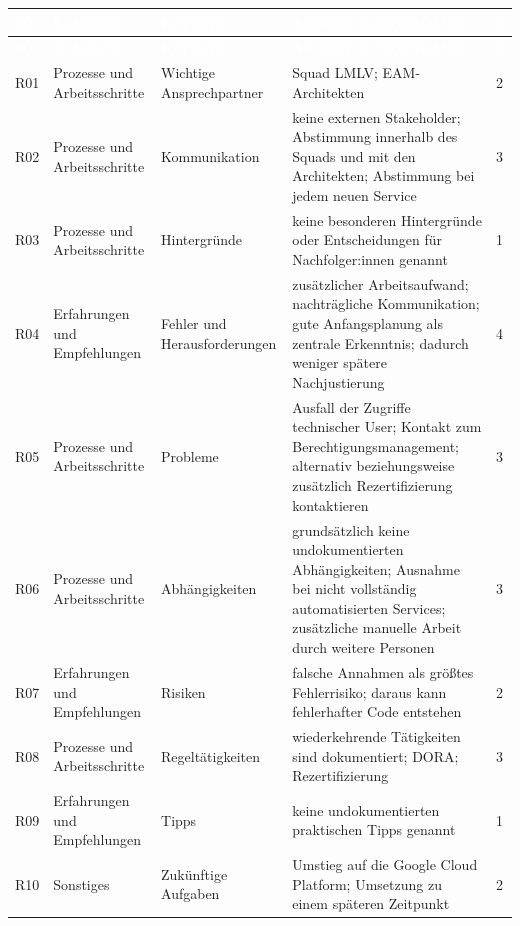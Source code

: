 \documentclass[
  10pt,
  ngerman,
  a4paper,
  toc=graduated,
  numbers=noenddot,
  headings=standardclasses
]{scrartcl}
\begin{document}
\scriptsize
\begin{longtable}{L{0.8cm}L{2.6cm}L{2.8cm}L{8.1cm}C{1.0cm}}
\toprule
{}
\textcolor{white}{\textbf{ID}} &
\textcolor{white}{\textbf{Kategorie}} &
\textcolor{white}{\textbf{Keyword}} &
\textcolor{white}{\textbf{Atomare Referenzfakten}} &
\textcolor{white}{\textbf{n}}\\
\midrule
\endfirsthead
\toprule
{}
\textcolor{white}{\textbf{ID}} &
\textcolor{white}{\textbf{Kategorie}} &
\textcolor{white}{\textbf{Keyword}} &
\textcolor{white}{\textbf{Atomare Referenzfakten}} &
\textcolor{white}{\textbf{n}}\\
\midrule
\endhead
R01 & Prozesse und Arbeitsschritte & Wichtige Ansprechpartner & Squad LMLV; EAM-Architekten & 2\\
R02 & Prozesse und Arbeitsschritte & Kommunikation & keine externen Stakeholder; Abstimmung innerhalb des Squads und mit den Architekten; Abstimmung bei jedem neuen Service & 3\\
R03 & Prozesse und Arbeitsschritte & Hintergründe & keine besonderen Hintergründe oder Entscheidungen für Nachfolger:innen genannt & 1\\
R04 & Erfahrungen und Empfehlungen & Fehler und Herausforderungen & zusätzlicher Arbeitsaufwand; nachträgliche Kommunikation; gute Anfangsplanung als zentrale Erkenntnis; dadurch weniger spätere Nachjustierung & 4\\
R05 & Prozesse und Arbeitsschritte & Probleme & Ausfall der Zugriffe technischer User; Kontakt zum Berechtigungsmanagement; alternativ beziehungsweise zusätzlich Rezertifizierung kontaktieren & 3\\
R06 & Prozesse und Arbeitsschritte & Abhängigkeiten & grundsätzlich keine undokumentierten Abhängigkeiten; Ausnahme bei nicht vollständig automatisierten Services; zusätzliche manuelle Arbeit durch weitere Personen & 3\\
R07 & Erfahrungen und Empfehlungen & Risiken & falsche Annahmen als größtes Fehlerrisiko; daraus kann fehlerhafter Code entstehen & 2\\
R08 & Prozesse und Arbeitsschritte & Regeltätigkeiten & wiederkehrende Tätigkeiten sind dokumentiert; DORA; Rezertifizierung & 3\\
R09 & Erfahrungen und Empfehlungen & Tipps & keine undokumentierten praktischen Tipps genannt & 1\\
R10 & Sonstiges & Zukünftige Aufgaben & Umstieg auf die Google Cloud Platform; Umsetzung zu einem späteren Zeitpunkt & 2\\

\end{longtable}
\end{document}
